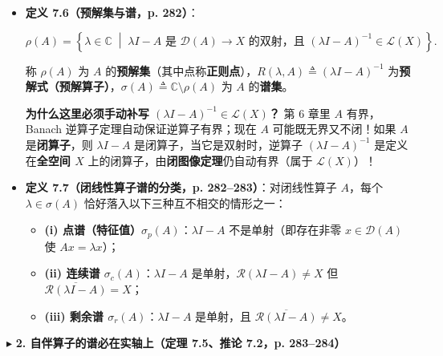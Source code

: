 \documentclass[11pt,a4paper]{article}
\providecommand{\tightlist}{\setlength{\itemsep}{2pt}\setlength{\parskip}{0pt}}
\newcommand{\SubSubHeading}[1]{%
  \Needspace{6.5\baselineskip}\vspace{5.5pt}\noindent
  \textcolor{AccentMain}{\scriptsize$\blacktriangleright$}\hspace{4pt}%
  {\small\bfseries\color{AccentMain}#1}\par\nopagebreak[4]\vspace{2.5pt}%
}
\renewenvironment{quote}{%
  \begin{tcolorbox}[
    enhanced,
    breakable,
    colback=AccentSoft!48!white,
    colframe=AccentMain,
    boxrule=0pt,
    leftrule=2.8pt,
    arc=2.5pt,
    left=9pt, right=8pt, top=6pt, bottom=6pt,
    before skip=5.5pt, after skip=5.5pt
  ]\small
}{%
  \end{tcolorbox}%
}
\newcommand{\FitDisplayMath}[1]{%
  \par\vspace{4.5pt}\noindent
  \begin{adjustbox}{max width=\linewidth, center}
    $\displaystyle #1$
  \end{adjustbox}
  \par\vspace{4.5pt}%
}
\begin{document}
\begin{itemize}
\item
  \textbf{定义 7.6（预解集与谱，p. 282）}： 
\FitDisplayMath{\rho(A) = \left\{\lambda \in \mathbb{C} \;\middle|\; \lambda I - A \text{ 是 } \mathcal{D}(A) \to X \text{ 的双射，且 } (\lambda I - A)^{-1} \in \mathcal{L}(X)\right\}.}
 称 \(\rho(A)\) 为 \(A\) 的\textbf{预解集}（其中点称\textbf{正则点}），\(R(\lambda, A) \triangleq (\lambda I - A)^{-1}\) 为\textbf{预解式（预解算子）}，\(\sigma(A) \triangleq \mathbb{C} \setminus \rho(A)\) 为 \(A\) 的\textbf{谱集}。

  \begin{quote}
  \textbf{为什么这里必须手动补写 \((\lambda I - A)^{-1} \in \mathcal{L}(X)\)？} 第 6 章里 \(A\) 有界，Banach 逆算子定理自动保证逆算子有界；现在 \(A\) 可能既无界又不闭！如果 \(A\) 是\textbf{闭算子}，则 \(\lambda I - A\) 是闭算子，当它是双射时，逆算子 \((\lambda I - A)^{-1}\) 是定义在\textbf{全空间 \(X\)} 上的闭算子，由\textbf{闭图像定理}仍自动有界（属于 \(\mathcal{L}(X)\)）！
  \end{quote}
\item
  \textbf{定义 7.7（闭线性算子谱的分类，p. 282--283）}：对闭线性算子 \(A\)，每个 \(\lambda \in \sigma(A)\) 恰好落入以下三种互不相交的情形之一：

  \begin{itemize}
  \tightlist
  \item
    \textbf{(i) 点谱（特征值）\(\sigma_p(A)\)}：\(\lambda I - A\) 不是单射（即存在非零 \(x \in \mathcal{D}(A)\) 使 \(Ax = \lambda x\)）；
  \item
    \textbf{(ii) 连续谱 \(\sigma_c(A)\)}：\(\lambda I - A\) 是单射，\(\mathcal{R}(\lambda I - A) \neq X\) 但 \(\overline{\mathcal{R}(\lambda I - A)} = X\)；
  \item
    \textbf{(iii) 剩余谱 \(\sigma_r(A)\)}：\(\lambda I - A\) 是单射，且 \(\overline{\mathcal{R}(\lambda I - A)} \neq X\)。
  \end{itemize}
\end{itemize}

\SubSubHeading{2. 自伴算子的谱必在实轴上（定理 7.5、推论 7.2，p. 283--284）}
\end{document}
